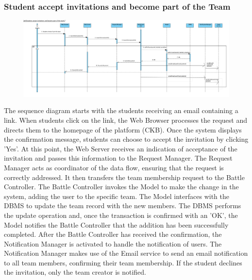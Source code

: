 \subsubsection{Student accept invitations and become part of the Team}
\begin{figure}[H]
    \centering
    \includegraphics[width=1\textwidth]{SequenceDiagram/Students accept invitations and become part of the team.png}
    \label{fig:enter-label}
\end{figure}
The sequence diagram starts with the students receiving an email containing a link. When students click on the link, the Web Browser processes the request and directs them to the homepage of the platform (CKB). Once the system displays the confirmation message, students can choose to accept the invitation by clicking 'Yes'.
At this point, the Web Server receives an indication of acceptance of the invitation and passes this information to the Request Manager. The Request Manager acts as coordinator of the data flow, ensuring that the request is correctly addressed.
It then transfers the team membership request to the Battle Controller. The Battle Controller invokes the Model to make the change in the system, adding the user to the specific team.
The Model interfaces with the DBMS to update the team record with the new members. The DBMS performs the update operation and, once the transaction is confirmed with an 'OK', the Model notifies the Battle Controller that the addition has been successfully completed.
After the Battle Controller has received the confirmation, the Notification Manager is activated to handle the notification of users. The Notification Manager makes use of the Email service to send an email notification to all team members, confirming their team membership.
If the student declines the invitation, only the team creator is notified.

